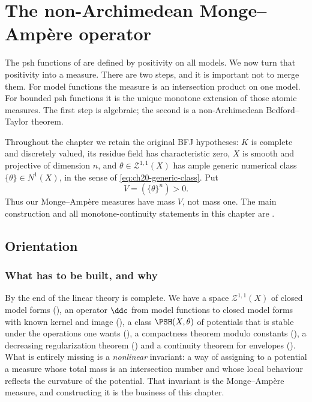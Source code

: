 \chapter{The non-Archimedean Monge--Amp\`ere operator}
\label{chap:bfj-ma}

The psh functions of  are defined by positivity on
all models.  We now turn that positivity into a measure.  There are two steps,
and it is important not to merge them. For model functions the measure is an
intersection product on one model. For bounded psh functions it is the unique
monotone extension of those atomic measures. The first step is algebraic; the
second is a non-Archimedean Bedford--Taylor theorem.

Throughout the chapter we retain the original BFJ hypotheses: $K$ is
complete and discretely valued, its residue field has characteristic zero,
$X$ is smooth and projective of dimension $n$, and
$\theta\in\mathcal Z^{1,1}(X)$ has ample generic numerical class
$\{\theta\}\in N^1(X)$, in the sense of \eqref{eq:ch20-generic-class}. Put
\[
                         V=(\{\theta\}^n)>0.
\]
Thus our Monge--Amp\`ere measures have mass $V$, not mass one. The main
construction and all monotone-continuity statements in this chapter are
\cite[\S\S2.7 and~3]{BFJ15}.

\section{Orientation}
\label{sec:ch24-orientation}

\subsection{What has to be built, and why}
\label{sec:ch24-why}

By the end of  the linear theory is complete.  We
have a space $\mathcal Z^{1,1}(X)$ of closed model forms
(), an operator $\ddc$ from model
functions to closed model forms with known kernel and image
(), a class $\PSH(X,\theta)$ of potentials that is
stable under the operations one wants (), a
compactness theorem modulo constants (), a
decreasing regularization theorem ()
and a continuity theorem for envelopes ().
What is entirely missing is a \emph{nonlinear} invariant: a way of assigning
to a potential a measure whose total mass is an intersection number and whose
local behaviour reflects the curvature of the potential.  That invariant is
the Monge--Amp\`ere measure, and constructing it is the business of this
chapter.

